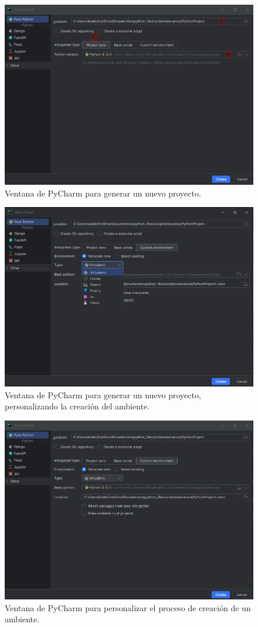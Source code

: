 \documentclass{article}
\begin{document}
	\begin{figure}[H]
		\centering
		\includegraphics[width=0.8\linewidth]{Figura13}
		\caption{Ventana de PyCharm para generar un nuevo proyecto.}
		\label{fig:figura13}
	\end{figure}
	
	\begin{figure}[H]
		\centering
		\includegraphics[width=0.8\linewidth]{Figura14}
		\caption{Ventana de PyCharm para generar un nuevo proyecto, personalizando la creación del ambiente.}
		\label{fig:figura14}
	\end{figure}
	
	\begin{figure}[H]
		\centering
		\includegraphics[width=0.8\linewidth]{Figura15}
		\caption{Ventana de PyCharm para personalizar el proceso de creación de un ambiente.}
		\label{fig:figura15}
	\end{figure}
	
\end{document}
